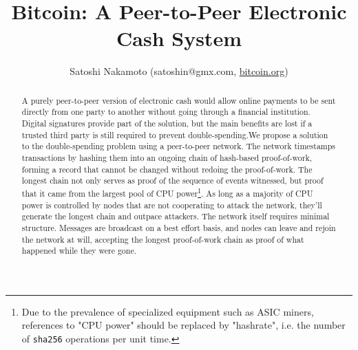 \documentclass[nohyper]{tufte-handout}
\begin{document}
\renewcommand{\abstractname}{\vspace{-\baselineskip}}

\title{Bitcoin: A Peer-to-Peer Electronic Cash System}
\author{Satoshi Nakamoto \footnotesize{({satoshin@gmx.com}, 
\href{http://www.bitcoin.org}{bitcoin.org})}}
\date{}


\maketitle


\begin{abstract}
\noindent
{}
A purely peer-to-peer version of electronic cash would allow online payments to be sent directly from one party to another without going through a financial institution. Digital signatures provide part of the solution, but the main benefits are lost if a trusted third party is still required to prevent double-spending.We propose a solution to the double-spending problem using a peer-to-peer network. The network timestamps transactions by hashing them into an ongoing chain of hash-based proof-of-work, forming a record that cannot be changed without redoing the proof-of-work. The longest chain not only serves as proof of the sequence of events witnessed, but proof that it came from the largest pool of CPU power\footnote{Due to the prevalence of specialized equipment such as ASIC miners, references to "CPU power" should be replaced by "hashrate", i.e. the number of \texttt{sha256} operations per unit time.}. As long as a majority of CPU power is controlled by nodes that are not cooperating to attack the network, they'll generate the longest chain and outpace attackers. The network itself requires minimal structure. Messages are broadcast on a best effort basis, and nodes can leave and rejoin the network at will, accepting the longest proof-of-work chain as proof of what happened while they were gone. 
\end{abstract}
\end{document}
